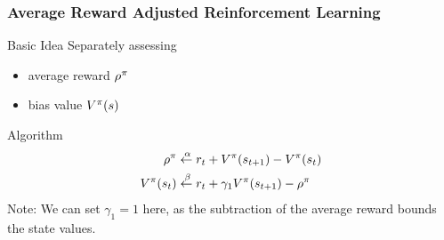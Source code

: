 \documentclass[xcolor=table%
,t]{beamer}
\begin{document}
\begin{frame}[t]
  \frametitle{Average Reward Adjusted Reinforcement Learning}

  \begin{block}{Basic Idea}
    Separately assessing
    \begin{itemize}
    \item average reward \(\rho^{\pi}\)
    \item bias value \(V^{\pi}(s)\)
    \end{itemize}
  \end{block}\pause

  \begin{block}{Algorithm}
    \vspace{-2ex}
    \begin{align*}
      \rho^{\pi}  & \overset{\hspace{2pt}\alpha}{\leftarrow} r_{t} + V^\pi(s_{t+1}) - V^\pi(s_{t})\\
      V^\pi(s_{t}) & \overset{\hspace{2pt}\beta}{\leftarrow} r_{t} + \gamma_{1} V^\pi(s_{t+1}) - \rho^{\pi}
    \end{align*}
    Note: We can set \(\gamma_{1} = 1\) here, as the subtraction of the average reward bounds the
    state values.
  \end{block}
\end{frame}
\end{document}
